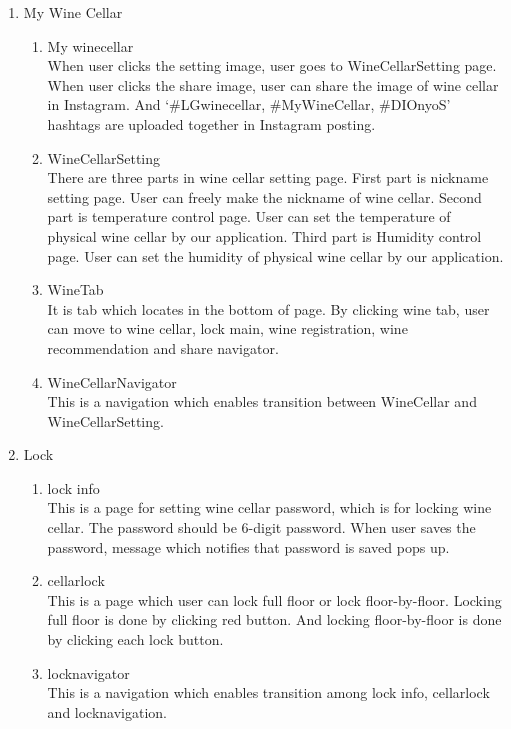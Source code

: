 \documentclass[conference]{IEEEtran}
\numberwithin{figure}{subsection}
\begin{document}
\begin{enumerate}
\begin{enumerate}
        \end{enumerate}
        \item My Wine Cellar
        \begin{enumerate}
            \item My winecellar\\
            When user clicks the setting image, user goes to WineCellarSetting page. 
            When user clicks the share image, user can share the image of wine cellar in Instagram. And ‘\#LGwinecellar, \#MyWineCellar, \#DIOnyoS’ hashtags are uploaded together in Instagram posting.
            \item WineCellarSetting\\
            There are three parts in wine cellar setting page. First part is  nickname setting page. User can freely make the nickname of wine cellar. Second part is temperature control page. User can set the temperature of physical wine cellar by our application. Third part is Humidity control page. User can set the humidity of physical wine cellar by our application.
            \item WineTab\\
            It is tab which locates in the bottom of page. By clicking wine tab, user can move to wine cellar, lock main, wine registration, wine recommendation and share navigator. 
            \item WineCellarNavigator\\
            This is a navigation which enables transition between WineCellar and WineCellarSetting.
        \end{enumerate}
        \item Lock
        \begin{enumerate}
            \item lock info\\
             This is a page for setting wine cellar password, which is for locking wine cellar. The password should be 6-digit password. When user saves the password, message which notifies that password is saved pops up.
            \item cellarlock\\
            This is a page which user can lock full floor or lock floor-by-floor. Locking full floor is done by clicking red button. And locking floor-by-floor is done by clicking each lock button. 
            \item locknavigator\\
            This is a navigation which enables transition among lock info, cellarlock and locknavigation.

\end{enumerate}
\end{enumerate}
\end{document}
